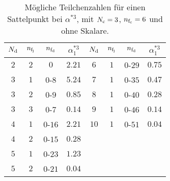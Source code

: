 \begin{table}
\centering
 \begin{tabular}{ccc|c||ccc|c}
 \toprule \midrule
 $N_\text{d}$ 	& $n_{\text{f}_\text{j}}$ 	& $n_{\text{f}_\text{d}}$ 	& $\alpha^{*3}_1$ & $N_\text{d}$ 	& $n_{\text{f}_\text{j}}$ 	& $n_{\text{f}_\text{d}}$ 	& $\alpha^{*3}_1$		 \\
 \midrule 
 $2$	& $2$		& $0$			& $2.21$  & $6$		& $1$	& $0$-$29$	& $0.75$	\\
 $3$	& $1$		& $0$-$8$		& $5.24$  & $7$		& $1$	& $0$-$35$	& $0.47$	\\
 $3$	& $2$		& $0$-$9$		& $0.85$  & $8$		& $1$	& $0$-$40$	& $0.28$	\\
 $3$	& $3$		& $0$-$7$		& $0.14$  & $9$		& $1$	& $0$-$46$	& $0.14$	\\
 $4$	& $1$		& $0$-$16$		& $2.21$  & $10$	& $1$	& $0$-$51$	& $0.04$	\\
 $4$	& $2$		& $0$-$15$		& $0.28$   		\\
 $5$	& $1$		& $0$-$23$		& $1.23$   		\\
 $5$	& $2$		& $0$-$21$		& $0.04$  		\\
 \midrule \bottomrule
 \end{tabular}
\caption{Mögliche Teilchenzahlen für einen Sattelpunkt bei $\alpha^{*3}$, mit $N_\text{c}=3$, $n_{\text{f}_\text{c}}=6$ und ohne Skalare.}
\label{tab:beta_QCDxdQCD:Fix3_ohne_Skalare}
\end{table}
